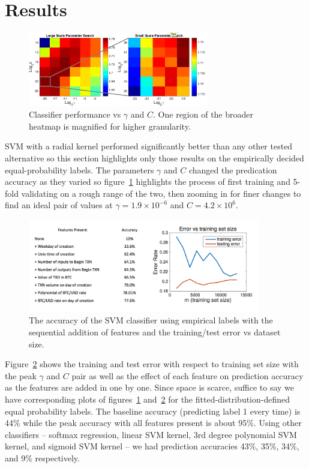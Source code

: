 \documentclass[11pt]{article}
\begin{document}
\section{Results}
\begin{figure}
\begin{center}
\includegraphics[width=0.7\textwidth]{figures/paramSearch}
\end{center}
\caption{Classifier performance vs $\gamma$ and $C$. One region of the broader heatmap is magnified for higher granularity.}
\label{paramSearch}
\end{figure}

SVM with a radial kernel performed significantly better than any other tested alternative so this section highlights only those results on the empirically decided equal-probability labels. The parameters $\gamma$ and $C$ changed the predication accuracy as they varied so figure~\ref{paramSearch} highlights the process of first training and 5-fold validating on a rough range of the two, then zooming in for finer changes to find an ideal pair of values at $\gamma = 1.9 \times 10^{-6}$ and $C = 4.2 \times 10^{6}$. 

\begin{figure}
\begin{center}
\includegraphics[width=0.9\textwidth]{figures/accuracy}
\end{center}
\caption{The accuracy of the SVM classifier using empirical labels with the sequential addition of features and the training/test error vs dataset size.}
\label{accuracy}
\end{figure}

Figure~\ref{accuracy} shows the training and test error with respect to training set size with the peak $\gamma$ and $C$ pair as well as the effect of each feature on prediction accuracy as the features are added in one by one. Since space is scarce, suffice to say we have corresponding plots of figures~\ref{paramSearch} and~\ref{accuracy} for the fitted-distribution-defined equal probability labels. The baseline accuracy (\ie predicting label 1 every time) is 44\% while the peak accuracy with all features present is about 95\%. Using other classifiers -- softmax regression, linear SVM kernel, 3rd degree polynomial SVM kernel, and sigmoid SVM kernel -- we had prediction accuracies 43\%, 35\%, 34\%, and 9\% respectively. 
\end{document}
